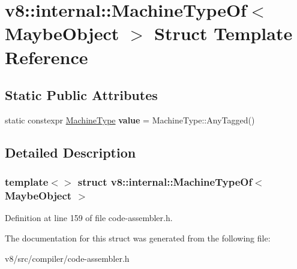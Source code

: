 \hypertarget{structv8_1_1internal_1_1MachineTypeOf_3_01MaybeObject_01_4}{}\section{v8\+:\+:internal\+:\+:Machine\+Type\+Of$<$ Maybe\+Object $>$ Struct Template Reference}
\label{structv8_1_1internal_1_1MachineTypeOf_3_01MaybeObject_01_4}
\subsection*{Static Public Attributes}
\begin{DoxyCompactItemize}
\item 
\mbox{\label{structv8_1_1internal_1_1MachineTypeOf_3_01MaybeObject_01_4_a2c2d1a8588593a6eb0a5aa42430f8f16}} 
static constexpr \mbox{\hyperlink{classv8_1_1internal_1_1MachineType}{Machine\+Type}} {\bfseries value} = Machine\+Type\+::\+Any\+Tagged()
\end{DoxyCompactItemize}


\subsection{Detailed Description}
\subsubsection*{template$<$$>$\newline
struct v8\+::internal\+::\+Machine\+Type\+Of$<$ Maybe\+Object $>$}



Definition at line 159 of file code-\/assembler.\+h.



The documentation for this struct was generated from the following file\+:\begin{DoxyCompactItemize}
\item 
v8/src/compiler/code-\/assembler.\+h\end{DoxyCompactItemize}
